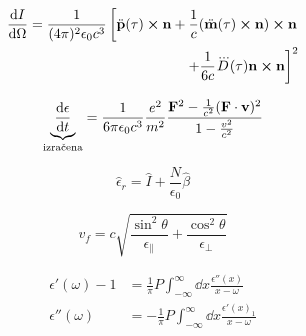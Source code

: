 \documentclass[11pt,twoside]{article}
\begin{document}
\begin{multicols}{3}
\begin{eqnarray}
\dv{I}{\Omega} = \frac{1}{(4\pi)^2\epsilon_0 c^3}\left[\ddot{\vb{p}}(\tau)\cross\vb{n} + \frac{1}{c}(\ddot{\vb{m}}(\tau)\cross\vb{n})\cross\vb{n} \right. \\ \left. +\frac{1}{6c}\dddot{D}(\tau)\vb{n}\cross\vb{n}\right]^2
\end{eqnarray}

\begin{equation}
\underbrace{\dv{\epsilon}{t}}_{\text{izra\v cena}} = \frac{1}{6\pi\epsilon_0 c^3} \frac{e^2}{m^2}\frac{\vb{F}^2-\frac{1}{c^2}(\vb{F}\cdot\vb{v})^2}{1-\frac{v^2}{c^2}}
\end{equation}

\begin{equation}
\hat{\epsilon}_r= \hat{I} + \frac{N}{\epsilon_0}\hat{\beta}
\end{equation}

\begin{equation}
v_f = c \sqrt{\frac{\sin^2 \theta}{\epsilon_\parallel} + \frac{\cos^2 \theta}{\epsilon_\perp}}
\end{equation}

\begin{equation}
\begin{split}
\epsilon'(\omega)-1&=\frac{1}{\pi}P\int_{-\infty}^{\infty}\dd x \frac{\epsilon''(x)}{x-\omega} \\
\epsilon''(\omega) &= -\frac{1}{\pi} P \int_{-\infty}^{\infty}\dd x \frac{\epsilon'(x)_1}{x-\omega}
\end{split}
\end{equation}
\end{multicols}
\end{document}
